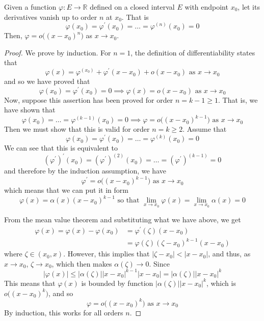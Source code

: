 \documentclass{article}
\begin{document}
    \begin{lemma}
      Given a function $\varphi: E \longrightarrow \mathbb{R}$ defined on a closed interval $E$ with endpoint $x_0$, let its derivatives vanish up to order $n$ at $x_0$. That is
      \[\varphi(x_0) = \varphi^\prime (x_0) = \ldots = \varphi^{(n)} (x_0) = 0\]
      Then, $\varphi = o\big((x - x_0)^n\big)$ as $x \rightarrow x_0$. 
    \end{lemma}
    \begin{proof}
    We prove by induction. For $n = 1$, the definition of differentiability states that 
    \[\varphi(x) = \varphi^(x_0) + \varphi^\prime (x - x_0) + o(x - x_0) \text{ as } x \rightarrow x_0\]
    and so we have proved that 
    \[\varphi(x_0) = \varphi^\prime (x_0) = 0 \implies \varphi(x) = o(x - x_0) \text{ as } x \rightarrow x_0\]
    Now, suppose this assertion has been proved for order $n = k - 1 \geq 1$. That is, we have shown that 
    \[\varphi(x_0) = \ldots = \varphi^{(k-1)}(x_0) = 0 \implies \varphi= o\big((x - x_0)^{k-1}\big) \text{ as } x \rightarrow x_0\]
    Then we must show that this is valid for order $n = k \geq 2$. Assume that 
    \[\varphi(x_0) = \varphi^\prime (x_0) = \ldots = \varphi^{(k)} (x_0) = 0\]
    We can see that this is equivalent to
    \[(\varphi^\prime)^\prime (x_0) = (\varphi^\prime)^{(2)} (x_0) = \ldots = (\varphi^\prime)^{(k-1)} = 0\]
    and therefore by the induction assumption, we have
    \[\varphi^\prime = o\big( (x - x_0)^{k-1}\big) \text{ as } x \rightarrow x_0\]
    which means that we can put it in form 
    \[\varphi(x) = \alpha (x) (x - x_0)^{k-1} \text{ so that } \lim_{x \rightarrow x_0} \varphi(x) = \lim_{x \rightarrow x_0} \alpha(x) = 0 \]

    From the mean value theorem and substituting what we have above, we get 
    \begin{align*}
        \varphi(x) = \varphi(x) - \varphi(x_0) & = \varphi^\prime(\zeta) (x - x_0) \\
        & = \varphi (\zeta) (\zeta - x_0)^{k-1} (x - x_0)
    \end{align*}
    where $\zeta \in (x_0, x)$. However, this implies that $|\zeta - x_0| < |x - x_0|$, and thus, as $x \rightarrow x_0$, $\zeta \rightarrow x_0$, which then makes $\alpha(\zeta) \rightarrow 0$. Since
    \[|\varphi (x)| \leq |\alpha(\zeta)| |x - x_0|^{k-1} |x - x_0| = |\alpha(\zeta)| |x - x_0|^k\]
    This means that $\varphi(x)$ is bounded by function $|\alpha(\zeta)| |x - x_0|^k$, which is $o\big((x-x_0)^k\big)$, and so 
    \[\varphi = o\big( (x - x_0)^k \big) \text{ as } x \rightarrow x_0\]
    By induction, this works for all orders $n$. 
    \end{proof}
\end{document}
